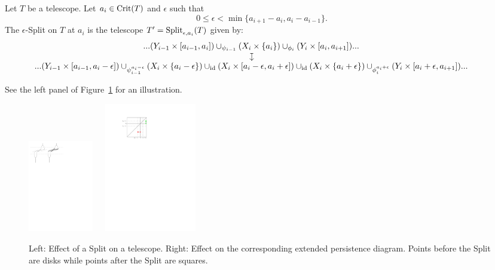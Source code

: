 \begin{defin}[Split]\label{def:split}
Let $T$ be a telescope.
Let $a_i\in\mathrm{Crit}(T)$ and $\epsilon$ such that $$0\leq\epsilon<\displaystyle\min\{a_{i+1}-a_i,a_i-a_{i-1}\}.$$ 
The $\epsilon$-Split on $T$ at $a_i$ is the telescope $T'=\mathrm{Split}_{\epsilon,a_i}(T)$ given by:
%
\[~\hspace{-10mm}
\begin{array}{c}
...(Y_{i-1}\times[a_{i-1},a_i])\cup_{\psi_{i-1}}(X_i\times\{a_i\})\cup_{\phi_i}(Y_i\times[a_i,a_{i+1}])... \\
\rotatebox[origin=c]{270}{$\mapsto$}\\
...(Y_{i-1}\times[a_{i-1},a_i-\epsilon])\cup_{\psi_{i-1}^{a_i-\epsilon}}(X_i\times\{a_i-\epsilon\})
\cup_{{\rm id}}(X_i\times[a_i-\epsilon,a_i+\epsilon])\cup_{{\rm id}}(X_i\times\{a_i+\epsilon\})
\cup_{\phi_i^{a_i+\epsilon}}(Y_i\times[a_i+\epsilon,a_{i+1}])...
\end{array}
\]
%
\end{defin}

See the left panel of Figure~\ref{fig:splitspace} for an
illustration.  
%
\begin{figure}[h!]\begin{center}
\includegraphics[height=4cm]{figures/SplitSpace}\ \ \ \includegraphics[width = 4cm]{figures/SplitPD}
\caption[Split]{\label{fig:splitspace} Left: Effect of a Split on a telescope. %
Right: Effect on the corresponding extended persistence diagram. Points before the Split are disks while points after the Split are squares.}
\end{center}\end{figure}
%




